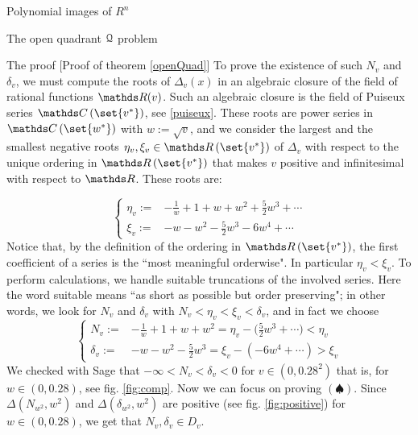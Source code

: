 \documentclass[11pt, a4paper, english, twoside, notitlepage, openright]{report}
\begin{document}
\begin{chapter}{Polynomial images of $R^n$}
\begin{section}{The open quadrant $\mathcal{Q}$ problem}
\begin{subsection}{The proof} [Proof of theorem \ref{openQuad}]
To prove the existence of such $N_v$ and $\delta_v$, we must compute the roots of $\Delta_v(x)$ in an algebraic closure of the field of rational functions $\R(v)$. Such an algebraic closure is the field of Puiseux series $\C\left(\set{v^*}\right)$, see \ref{puiseux}. These roots are power series in $\C\left(\set{w^*}\right)$ with $w:=\sqrt{v}$, and we consider the largest and the smallest negative roots $\eta_v,\xi_v\in\R\left(\set{v^*}\right)$ of $\Delta_v$ with respect to the unique ordering in $\R\left(\set{v^*}\right)$ that makes $v$ positive and infinitesimal with respect to $\R$. These roots are:
			
\begin{equation*}\left\{\begin{split}
\eta_v:=&-\frac{1}{w}+1+w+w^2+\frac{5}{2}w^3+\cdots\\
\xi_v:=&-w-w^2-\frac{5}{2}w^3-6w^4+\cdots
\end{split}\right.
\end{equation*}
Notice that, by the definition of the ordering in $\R\left(\set{v^*}\right)$, the first coefficient of a series is the ``most meaningful orderwise". In particular $\eta_v<\xi_v$. To perform calculations, we handle suitable truncations of the involved series. Here the word suitable means ``as short as possible but order preserving"; in other words, we look for $N_v$ and $\delta_v$ with $N_v<\eta_v<\xi_v<\delta_v$, and in fact we choose
\begin{equation*}\left\{
\begin{split}
N_v:=&-\frac{1}{w}+1+w+w^2=\eta_v-\Big(\frac{5}{2}w^3+\cdots\Big)<\eta_v\\
\delta_v:=&-w-w^2-\frac{5}{2}w^3=\xi_v-(-6w^4+\cdots)>\xi_v
\end{split}\right.
\end{equation*}
We checked with Sage that $-\infty<N_v<\delta_v<0$ for $v\in (0,0.28^2)$ that is, for $w\in(0,0.28)$, see fig. \ref{fig:comp}. Now we can focus on proving $(\spadesuit)$. Since $\Delta(N_{w^2},w^2)$ and $\Delta(\delta_{w^2},w^2)$ are positive (see fig. \ref{fig:positive}) for $w\in (0,0.28)$, we get that $N_v, \delta_v\in D_v$.
\begin{figure}[h]\hspace{-1.25cm}
\begin{subfigure}{.56\linewidth}\centering

\end{subfigure}
\end{figure}
\end{subsection}
\end{section}
\end{chapter}
\end{document}
